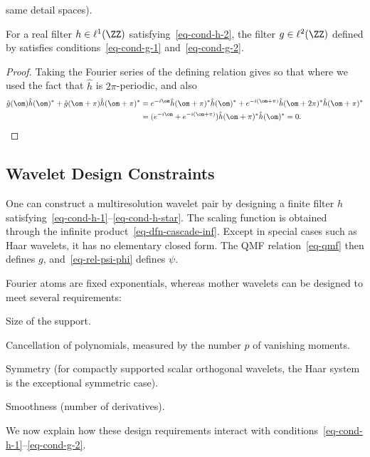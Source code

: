  same detail spaces).

\begin{prop}
	For a real filter $h\in\ell^1(\ZZ)$ satisfying~\eqref{eq-cond-h-2}, the filter $g \in \ell^2(\ZZ)$ defined by
	satisfies conditions~\eqref{eq-cond-g-1} and~\eqref{eq-cond-g-2}.
\end{prop}

\begin{proof}
	Taking the Fourier series of the defining relation gives
	so that 
	where we used the fact that $\hat h$ is $2\pi$-periodic, 
	and also 
	\begin{align*}
		\hat g(\om) \hat h(\om)^* + \hat g(\om+\pi) \hat h(\om+\pi)^* &= 
		e^{-i \om} \hat h(\om+\pi)^* \hat h(\om)^* + e^{-i (\om+\pi)} \hat h(\om+2\pi)^* \hat h(\om+\pi)^* \\
		&=
		(e^{-i \om}+e^{-i (\om+\pi)}) \hat h(\om+\pi)^* \hat h(\om)^*
		=0.
	\end{align*}
\end{proof}





                                   
\subsection{Wavelet Design Constraints}

One can construct a multiresolution wavelet pair by designing a finite filter $h$ satisfying~\eqref{eq-cond-h-1}--\eqref{eq-cond-h-star}. The scaling function is obtained through the infinite product~\eqref{eq-dfn-cascade-inf}. Except in special cases such as Haar wavelets, it has no elementary closed form. The QMF relation~\eqref{eq-qmf} then defines $g$, and~\eqref{eq-rel-psi-phi} defines $\psi$.

Fourier atoms are fixed exponentials, whereas mother wavelets can be designed to meet several requirements:
\begin{rs}
	\item Size of the support.
	\item Cancellation of polynomials, measured by the number $p$ of vanishing moments.
	\item Symmetry (for compactly supported scalar orthogonal wavelets, the Haar system is the exceptional symmetric case).
	\item Smoothness (number of derivatives).
\end{rs}
We now explain how these design requirements interact with conditions~\eqref{eq-cond-h-1}--\eqref{eq-cond-g-2}.

